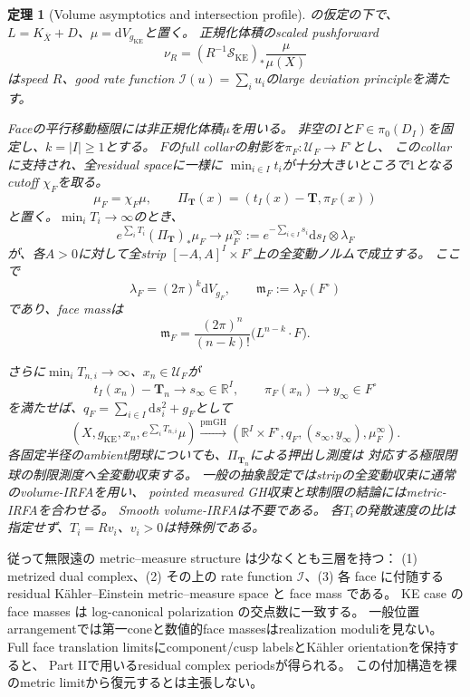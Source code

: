 \documentclass[11pt,a4paper]{ltjsarticle}
\newcommand{\RR}{\mathbb R}
\newcommand{\dd}{\mathrm d}
\newcommand{\cI}{\mathcal I}
\newcommand{\cS}{\mathcal S}
\newcommand{\ov}{\overline}
\theoremstyle{plain}
\newtheorem{theorem}{定理}[section]
\theoremstyle{definition}
\theoremstyle{remark}
\begin{document}
\begin{theorem}[Volume asymptotics and intersection profile]
\label{thm:intro-measure}
の仮定の下で、
$L=K_{\ov X}+D$、$\mu=\dd V_{g_{\mathrm{KE}}}$と置く。
正規化体積のscaled pushforward
\[
 \nu_R=(R^{-1}\cS_{\mathrm{KE}})_*\frac{\mu}{\mu(X)}
\]
はspeed $R$、good rate function
$\cI(u)=\sum_i u_i$のlarge deviation principleを満たす。

Faceの平行移動極限には非正規化体積$\mu$を用いる。
非空の$I$と$F\in\pi_0(D_I)$を固定し、$k=|I|\ge1$とする。
$F$のfull collarの射影を$\pi_F:\mathcal U_F\to F^\circ$とし、
このcollarに支持され、全residual spaceに一様に
$\min_{i\in I}t_i$が十分大きいところで$1$となるcutoff $\chi_F$を取る。
\[
 \mu_F=\chi_F\mu,
 \qquad
 \Pi_{\bm T}(x)=(t_I(x)-\bm T,\pi_F(x))
\]
と置く。$\min_iT_i\to\infty$のとき、
\[
 e^{\sum_iT_i}(\Pi_{\bm T})_*\mu_F
 \longrightarrow
 \mu_F^\infty
 :=e^{-\sum_{i\in I}s_i}\dd s_I\otimes\lambda_F
\]
が、各$A>0$に対して全strip
$[-A,A]^I\times F^\circ$上の全変動ノルムで成立する。
ここで
\[
 \lambda_F=(2\pi)^k\dd V_{g_F},
 \qquad
 \mathfrak m_F:=\lambda_F(F^\circ)
\]
であり、face massは
\begin{equation}
\label{eq:intro-mass}
 \boxed{
 \mathfrak m_F=
 \frac{(2\pi)^n}{(n-k)!}\bigl(L^{n-k}\cdot F\bigr).}
\end{equation}

さらに$\min_iT_{n,i}\to\infty$、$x_n\in\mathcal U_F$が
\[
 t_I(x_n)-\bm T_n\to s_\infty\in\RR^I,
 \qquad
 \pi_F(x_n)\to y_\infty\in F^\circ
\]
を満たせば、$q_F=\sum_{i\in I}\dd s_i^2+g_F$として
\[
 (X,g_{\mathrm{KE}},x_n,e^{\sum_iT_{n,i}}\mu)
 \xrightarrow{\mathrm{pmGH}}
 (\RR^I\times F^\circ,q_F,(s_\infty,y_\infty),\mu_F^\infty).
\]
各固定半径のambient閉球についても、$\Pi_{\bm T_n}$による押出し測度は
対応する極限閉球の制限測度へ全変動収束する。
一般の抽象設定ではstripの全変動収束に通常のvolume-IRFAを用い、
pointed measured GH収束と球制限の結論にはmetric-IRFAを合わせる。
Smooth volume-IRFAは不要である。
各$T_i$の発散速度の比は指定せず、$T_i=Rv_i$、$v_i>0$は特殊例である。
\end{theorem}

従って無限遠の metric--measure structure は少なくとも三層を持つ：
(1) metrized dual complex、(2) その上の rate function $\cI$、(3) 各 face に付随する residual K\"ahler--Einstein metric--measure space と face mass である。
KE case の face masses は log-canonical polarization の交点数に一致する。
一般位置arrangementでは第一coneと数値的face massesはrealization moduliを見ない。
Full face translation limitsにcomponent/cusp labelsとK\"ahler orientationを保持すると、
Part IIで用いるresidual complex periodsが得られる。
この付加構造を裸のmetric limitから復元するとは主張しない。
\end{document}

